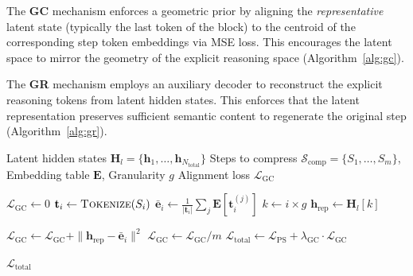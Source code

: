 The \textbf{GC} mechanism enforces a geometric prior by aligning the \textit{representative} latent state (typically the last token of the block) to the centroid of the corresponding step token embeddings via MSE loss. This encourages the latent space to mirror the geometry of the explicit reasoning space (Algorithm~\ref{alg:gc}).

The \textbf{GR} mechanism employs an auxiliary decoder to reconstruct the explicit reasoning tokens from latent hidden states. This enforces that the latent representation preserves sufficient semantic content to regenerate the original step (Algorithm~\ref{alg:gr}).


\begin{algorithm}[h]
\footnotesize
\caption{Geometric Compression (PS-GC)}
\label{alg:gc}
\begin{algorithmic}[1]
 Latent hidden states $\mathbf{H}_l = \{\mathbf{h}_1, \ldots, \mathbf{h}_{N_{\text{total}}}\}$
 Steps to compress $\mathcal{S}_{\text{comp}} = \{S_1, \ldots, S_m\}$, Embedding table $\mathbf{E}$, Granularity $g$
 Alignment loss $\mathcal{L}_{\text{GC}}$

\STATE $\mathcal{L}_{\text{GC}} \gets 0$
\STATE
{}
    \STATE $\mathbf{t}_i \gets \textsc{Tokenize}(S_i)$ 
    \STATE $\bar{\mathbf{e}}_i \gets \frac{1}{|\mathbf{t}_i|} \sum_{j} \mathbf{E}[\mathbf{t}_i^{(j)}]$ 
    \STATE $k \gets i \times g$ 
    \STATE $\mathbf{h}_{\text{rep}} \gets \mathbf{H}_l[k]$ 
    
    \STATE $\mathcal{L}_{\text{GC}} \gets \mathcal{L}_{\text{GC}} + \| \mathbf{h}_{\text{rep}} - \bar{\mathbf{e}}_i \|^2$
\ENDFOR
\STATE
\STATE $\mathcal{L}_{\text{GC}} \gets \mathcal{L}_{\text{GC}} / m$
\STATE $\mathcal{L}_{\text{total}} \gets \mathcal{L}_{\text{PS}} + \lambda_{\text{GC}} \cdot \mathcal{L}_{\text{GC}}$

 $\mathcal{L}_{\text{total}}$
\end{algorithmic}
\end{algorithm}

